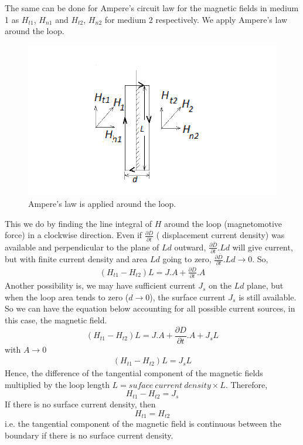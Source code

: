 The same can be done for Ampere's circuit law for the magnetic fields in medium 1 as $H_{t1}$, $H_{n1}$ and $H_{t2}$, $H_{n2}$ for medium 2 respectively. We apply Ampere's law around the loop.
\begin{figure}[h]
\centering
\includegraphics[width=1\linewidth]{graphics/diemedium4_2}
\caption{Ampere's law is applied around the loop.}
\end{figure}
This we do by finding the line integral of $H$ around the loop (magnetomotive force) in a clockwise direction. Even if $\frac{\partial\bar{D}}{\partial t}$ ( displacement current density) was available and perpendicular to the plane of $Ld$ outward, $\frac{\partial\bar{D}}{\partial t}. Ld$ will give current, but with finite current density and area $Ld$ going to zero,  $\frac{\partial\bar{D}}{\partial t}. Ld \rightarrow 0 $. So,
\begin{align*}
(H_{t1} - H_{t2})L = J.A +\frac{\partial D}{\partial t}.A
\end{align*}
Another possibility is, we may have sufficient current $J_s$ on the $Ld$ plane, but when the loop area tends to zero ($d \rightarrow 0 $), the surface current $J_s$ is still available. So we can have the equation below accounting for all possible current sources, in this case, the magnetic field.
\begin{equation}
(H_{t1} - H_{t2})L = J.A +\frac{\partial D}{\partial t}.A + J_sL
\end{equation}
with $A \rightarrow 0$
\begin{align*}
(H_{t1} - H_{t2})L = J_sL
\end{align*}
Hence, the difference of the tangential component of the magnetic fields multiplied by the loop length $L = suface\ current\ density \times L$. Therefore,
\begin{equation}
H_{t1} - H_{t2} = J_s
\end{equation}
If there is no surface current density, then 
\begin{equation}
H_{t1} = H_{t2}
\end{equation}
i.e. the tangential component of the magnetic field is continuous between the boundary if there is no surface current density.

